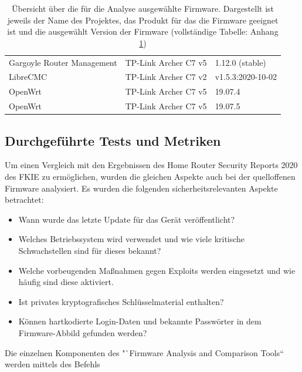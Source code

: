 \documentclass[a4paper]{book}
\begin{document}
\begin{large}
\begin{onehalfspace}
\begin{table}[ht]
\begin{center}
\begin{tabular}{lll}
Gargoyle Router Management & TP-Link Archer C7 v5 & 1.12.0 (stable) \\ 

LibreCMC & TP-Link Archer C7 v2 & v1.5.3:2020-10-02 \\ 

OpenWrt & TP-Link Archer C7 v5 & 19.07.4 \\ 

OpenWrt & TP-Link Archer C7 v5 & 19.07.5 \\ 

\end{tabular}%
\end{center}
\caption{Übersicht über die für die Analyse ausgewählte Firmware. Dargestellt ist jeweils der Name des Projektes, das Produkt für das die Firmware geeignet ist und die ausgewählt Version der Firmware (vollständige Tabelle: Anhang \ref{tab:Untersuchte Firmware})}
\label{tab:Untersuchte Firmware}
\end{table}

\end{onehalfspace}


\subsection{Durchgeführte Tests und Metriken}
\begin{onehalfspace}
Um einen Vergleich mit den Ergebnissen des \glqq Home Router Security Reports 2020\grqq{} des FKIE zu ermöglichen, wurden die gleichen Aspekte auch bei der quelloffenen Firmware analysiert. Es wurden die folgenden sicherheitsrelevanten Aspekte betrachtet:

\begin{itemize}
\item Wann wurde das letzte Update für das Gerät veröffentlicht?
\item Welches Betriebssystem wird verwendet und wie viele kritische Schwachstellen sind für dieses bekannt?
\item Welche vorbeugenden Maßnahmen gegen Exploits werden eingesetzt und wie häufig sind diese aktiviert.
\item Ist privates kryptografisches Schlüsselmaterial enthalten?
\item Können hartkodierte Login-Daten und bekannte Passwörter in dem Firmware-Abbild gefunden werden?
\end{itemize}

\noindent Die einzelnen Komponenten des "`Firmware Analysis and Comparison Tools“ werden mittels des Befehls \\


\end{onehalfspace}
\end{large}
\end{document}
